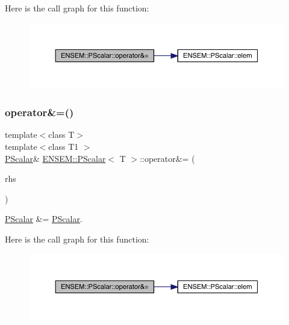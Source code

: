 Here is the call graph for this function\+:
\nopagebreak
\begin{figure}[H]
\begin{center}
\leavevmode
\includegraphics[width=350pt]{d3/d27/classENSEM_1_1PScalar_a9c683c36c7129b6b016af09f8d5cda42_cgraph}
\end{center}
\end{figure}
\mbox{\label{classENSEM_1_1PScalar_a9c683c36c7129b6b016af09f8d5cda42}} 
\subsubsection{\texorpdfstring{operator\&=()}{operator\&=()}\hspace{0.1cm}{\footnotesize\ttfamily [3/3]}}
{\footnotesize\ttfamily template$<$class T$>$ \\
template$<$class T1 $>$ \\
\mbox{\hyperlink{classENSEM_1_1PScalar}{P\+Scalar}}\& \mbox{\hyperlink{classENSEM_1_1PScalar}{E\+N\+S\+E\+M\+::\+P\+Scalar}}$<$ T $>$\+::operator\&= (\begin{DoxyParamCaption}\item[{const \mbox{\hyperlink{classENSEM_1_1PScalar}{P\+Scalar}}$<$ T1 $>$ \&}]{rhs }\end{DoxyParamCaption})\hspace{0.3cm}{\ttfamily [inline]}}



\mbox{\hyperlink{classENSEM_1_1PScalar}{P\+Scalar}} \&= \mbox{\hyperlink{classENSEM_1_1PScalar}{P\+Scalar}}. 

Here is the call graph for this function\+:
\nopagebreak
\begin{figure}[H]
\begin{center}
\leavevmode
\includegraphics[width=350pt]{d3/d27/classENSEM_1_1PScalar_a9c683c36c7129b6b016af09f8d5cda42_cgraph}
\end{center}
\end{figure}
\mbox{\label{classENSEM_1_1PScalar_addccfa9164f9d80554657387932185c4}} 
